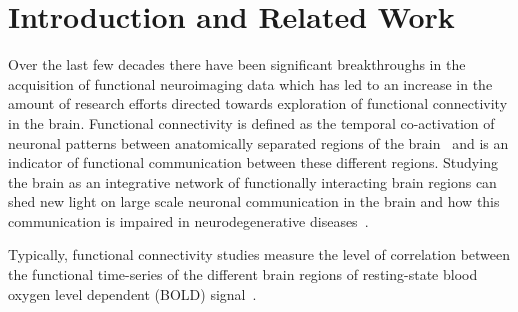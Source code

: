 \documentclass{llncs}
\begin{document}
\section{Introduction and Related Work}
Over the last  few decades there have been significant breakthroughs in the acquisition of  functional neuroimaging data which has led to an increase in the amount of research efforts directed towards exploration of functional connectivity in the brain. Functional connectivity is defined as the temporal co-activation of neuronal patterns between anatomically separated regions of the brain~\cite{aertsen1989dynamics} and is an indicator of functional communication between these different regions.  Studying the brain as an integrative network of functionally interacting brain regions can shed new light on large scale neuronal communication in the brain and how this communication is impaired in neurodegenerative diseases~\cite{bullmore2009complex,mohammadi2009changes,seeley2009neurodegenerative}. 


Typically, functional connectivity studies measure the level of correlation between the functional time-series of the different brain regions of resting-state blood oxygen level dependent (BOLD) signal~\cite{biswal1997simultaneous,damoiseaux2006consistent,salvador2005neurophysiological}.
\end{document}
